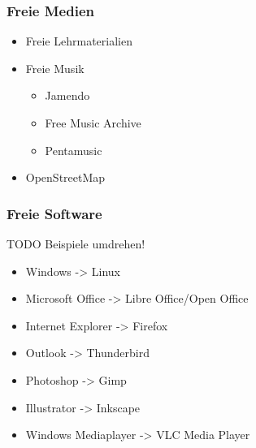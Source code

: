\documentclass{beamer}
\begin{document}
\begin{frame}
  \frametitle{Freie Medien}
  \begin{itemize}
    \item<2-> Freie Lehrmaterialien
    \item<3-> Freie Musik
      \begin{itemize}
        \item Jamendo
        \item Free Music Archive
        \item Pentamusic
      \end{itemize}
    \item<4-> OpenStreetMap
  \end{itemize}
\end{frame}

\begin{frame}
  \frametitle{Freie Software}
  TODO Beispiele umdrehen!
  \begin{itemize}
    \item Windows -> Linux
    \item Microsoft Office -> Libre Office/Open Office
    \item Internet Explorer -> Firefox
    \item Outlook -> Thunderbird
    \item Photoshop -> Gimp
    \item Illustrator -> Inkscape
    \item Windows Mediaplayer -> VLC Media Player
  \end{itemize}
\end{frame}
\end{document}
